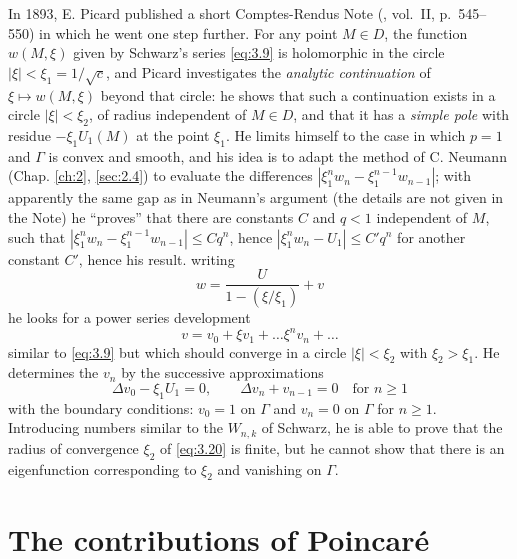 \documentclass[12pt,a4paper,leqno,twoside]{extbook}
\begin{document}
In 1893, E. Picard published a short Comptes-Rendus Note (\cite{172}, vol.~II, p.~545--550) in which he went one step further. For any point \(M \in D\), the function \(w(M, \xi)\) given by Schwarz's series \eqref{eq:3.9} is holomorphic in the circle \(|\xi| < \xi_1 = 1/\sqrt{c}\), and Picard investigates the \emph{analytic continuation} of \(\xi \mapsto w(M, \xi)\) beyond that circle: he shows that such a continuation exists in a circle \(|\xi| < \xi_2\), of radius independent of \(M \in D\), and that it has a \emph{simple pole} with residue \(-\xi_1 U_1(M)\) at the point \(\xi_1\). He limits himself to the case in which \(p = 1\) and \(\Gamma\) is convex and smooth, and his idea is to adapt the method of C. Neumann (Chap. \ref{ch:2}, \ref{sec:2.4}) to evaluate the differences \(\left| \xi^n_1 w_n - \xi^{n-1}_1 w_{n-1} \right|\); with apparently the same gap as in Neumann's argument (the details are not given in the Note) he ``proves'' that there are constants \(C\) and \(q < 1\) independent of \(M\), such that \(\left| \xi^n_1 w_n - \xi^{n-1}_1 w_{n-1} \right| \leq Cq^n\), hence \(\left| \xi^n_1 w_n - U_1 \right| \leq C'q^n\) for another constant \(C'\), hence his result. writing
\[
    w = \frac{U}{1 - (\xi / \xi_1)} + v
\]
he looks for a power series development
\begin{equation}
    \label{eq:3.20}
    v = v_0 + \xi v_1 + \ldots \xi^n v_n + \ldots
\end{equation}
similar to \eqref{eq:3.9} but which should converge in a circle \(|\xi| < \xi_2\) with \(\xi_2 > \xi_1\). He determines the \(v_n\) by the successive approximations
\[
    \Delta v_0 - \xi_1 U_1 = 0, \qquad \Delta v_n + v_{n-1} = 0 \quad \text{for } n \geq 1
\]
with the boundary conditions: \(v_0 = 1\) on \(\Gamma\) and \(v_n = 0\) on \(\Gamma\) for \(n \geq 1\). Introducing numbers similar to the \(W_{n, k}\) of Schwarz, he is able to prove that the radius of convergence \(\xi_2\) of \eqref{eq:3.20} is finite, but he cannot show that there is an eigenfunction corresponding to \(\xi_2\) and vanishing on \(\Gamma\).

\section{The contributions of Poincaré}
\label{sec:3.2}
\end{document}
